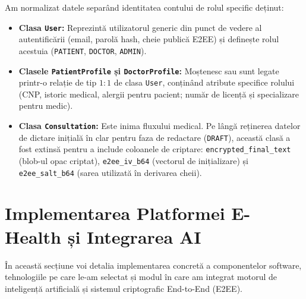 Am normalizat datele separând identitatea contului de rolul specific deținut:
\begin{itemize}
    \item \textbf{Clasa \texttt{User}:} Reprezintă utilizatorul generic din punct de vedere al autentificării (email, parolă hash, cheie publică E2EE) și definește rolul acestuia (\texttt{PATIENT}, \texttt{DOCTOR}, \texttt{ADMIN}).
    \item \textbf{Clasele \texttt{PatientProfile} și \texttt{DoctorProfile}:} Moștenesc sau sunt legate printr-o relație de tip $1:1$ de clasa \texttt{User}, conținând atribute specifice rolului (CNP, istoric medical, alergii pentru pacient; număr de licență și specializare pentru medic).
    \item \textbf{Clasa \texttt{Consultation}:} Este inima fluxului medical. Pe lângă reținerea datelor de dictare inițială în clar pentru faza de redactare (\texttt{DRAFT}), această clasă a fost extinsă pentru a include coloanele de criptare: \texttt{encrypted\_final\_text} (blob-ul opac criptat), \texttt{e2ee\_iv\_b64} (vectorul de inițializare) și \texttt{e2ee\_salt\_b64} (sarea utilizată în derivarea cheii).
\end{itemize}

\section{Implementarea Platformei E-Health și Integrarea AI}
\label{sec:ch4sec3}

În această secțiune voi detalia implementarea concretă a componentelor software, tehnologiile pe care le-am selectat și modul în care am integrat motorul de inteligență artificială și sistemul criptografic End-to-End (E2EE).

